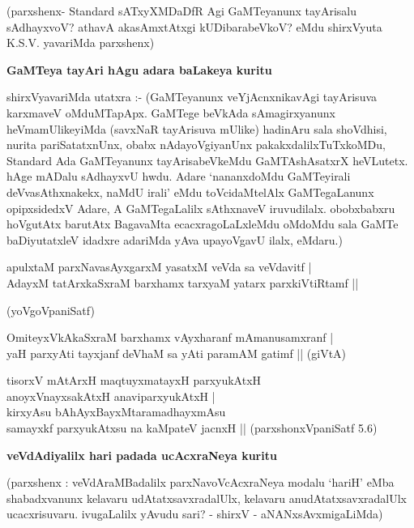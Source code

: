 (parxshenx- {\rm Standard} sATxyXMDaDfR Agi GaMTeyanunx tayArisalu sAdhayxvoV? athavA akasAmx\-tAtxgi kUDibarabeVkoV? eMdu shirxVyuta {\rm K.S.V.} yavariMda parxshenx)

{\bigskip
\noindent
{\large\bf GaMTeya tayAri hAgu adara baLakeya kuritu}}\label{page170}
\medskip

\noindent
shirxVyavariMda utatxra :- (GaMTeyanunx veYjAcnxnikavAgi tayArisuva karxmaveV oMduMTapApx. GaMTege beVkAda sAmagirxyanunx heVmamUlikeyiMda (savxNaR tayArisuva mUlike) hadinAru sala shoVdhisi,\- nurita pariSatatxnUnx, obabx nAdayoVgiyanUnx pakakxdalilxTuTxkoMDu, {\rm Standard} Ada GaMTeyanunx tayA\-risabeVkeMdu GaMTAshAsatxrX heVLutetx. hAge mADalu sAdhayxvU hwdu. Adare `nananxdoMdu GaMTeyirali deVvasAthxnakekx, naMdU irali' eMdu toVcidaMtelAlx GaMTegaLanunx opipxsidedxV Adare, A GaMTegaLalilx sAthxnaveV iruvudilalx. obobxbabxru hoVgutAtx barutAtx BagavaMta ecacxragoLaLxleMdu oMdoMdu sala GaMTe baDiyutatxleV idadxre adariMda yAva upayoVgavU ilalx, eMdaru.)
\begin{itemize}
{\bf 
\item[30.] apulxtaM parxNavasAyxgarxM yasatxM veVda sa veVdavitf |\\\label{148}
AdayxM tatArxkaSxraM barxhamx tarxyaM yatarx parxkiVtiRtamf ||

\hfill{(yoVgoVpaniSatf)}
\item[31.] OmiteyxVkAkaSxraM barxhamx vAyxharanf mAmanusamxranf |\\\label{148}
yaH parxyAti tayxjanf deVhaM sa yAti paramAM gatimf ||
\hfill{(giVtA)}
\item[32.] tisorxV mAtArxH maqtuyxmatayxH parxyukAtxH\\\label{148}
anoyxVnayxsakAtxH anaviparxyukAtxH |\\
kirxyAsu bAhAyxBayxMtaramadhayxmAsu\\
samayxkf parxyukAtxsu na kaMpateV jacnxH ||
\hfill{(parxshonxVpaniSatf 5.6)}}
\end{itemize}

\newpage

{\bigskip
\noindent
{\large\bf veVdAdiyalilx hari padada ucAcxraNeya kuritu}}\label{page149}
\medskip

\noindent
(parxshenx : veVdAraMBadalilx parxNavoVcAcxraNeya modalu `hariH' eMba shabadxvanunx kelavaru udAtatxsavxra\-dalUlx, kelavaru anudAtatxsavxradalUlx ucacxrisuvaru. ivuga\-Lalilx yAvudu sari? - shirxV - aNANxsAvxmi\-gaLiMda)

